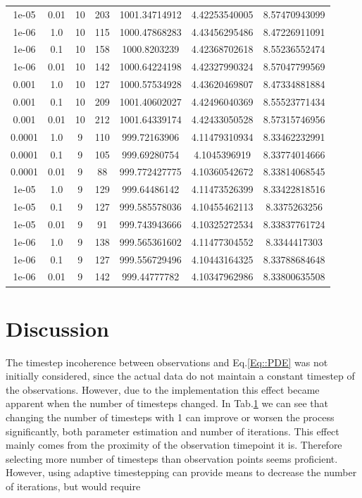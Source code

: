 \documentclass[11pt,a4paper]{article}
\begin{document}
\begin{table}
{\begin{tabular}{*{7}c}
 1e-05 & 0.01 &10 & 203& 1001.34714912 & 4.42253540005 & 8.57470943099 \\ 
 1e-06 & 1.0 &10  & 115& 1000.47868283 & 4.43456295486 & 8.47226911091 \\ 
 1e-06 & 0.1 &10  & 158& 1000.8203239 & 4.42368702618 & 8.55236552474 \\ 
 1e-06 & 0.01 &10 & 142& 1000.64224198 & 4.42327990324 & 8.57047799569 \\ 
 0.001 & 1.0 &10  & 127& 1000.57534928 & 4.43620469807 & 8.47334881884 \\ 
 0.001 & 0.1 &10  & 209& 1001.40602027 & 4.42496040369 & 8.55523771434 \\ 
 0.001 & 0.01 &10 & 212& 1001.64339174 & 4.42433050528 & 8.57315746956 \\ 
 0.0001 & 1.0 &9  & 110& 999.72163906 & 4.11479310934 & 8.33462232991 \\ 
 0.0001 & 0.1 &9  & 105& 999.69280754 & 4.1045396919 & 8.33774014666 \\ 
 0.0001 & 0.01 &9 &  88& 999.772427775 & 4.10360542672 & 8.33814068545 \\ 
 1e-05 & 1.0 &9   & 129& 999.64486142 & 4.11473526399 & 8.33422818516 \\ 
 1e-05 & 0.1 &9   & 127& 999.585578036 & 4.10455462113 & 8.3375263256 \\ 
 1e-05 & 0.01 &9  &  91& 999.743943666 & 4.10325272534 & 8.33837761724 \\ 
 1e-06 & 1.0 &9   & 138& 999.565361602 & 4.11477304552 & 8.3344417303 \\ 
 1e-06 & 0.1 &9   & 127& 999.556729496 & 4.10443164325 & 8.33788684648 \\ 
 1e-06 & 0.01 &9  & 142& 999.44777782 & 4.10347962986 & 8.33800635508 \\ 
\end{tabular}}
\label{Tab::Incoherence}
\end{table} 
\section{Discussion}

The timestep incoherence between observations and Eq.\ref{Eq::PDE} was not initially considered, since the actual data do not maintain a constant timestep of the observations. However, due to the implementation this effect became apparent when the number of timesteps changed. In Tab.\ref{Tab::Incoherence} we can see that changing the number of timesteps with 1 can improve or worsen the process significantly, both parameter estimation and number of iterations. This effect mainly comes from the proximity of the observation timepoint it is.  Therefore selecting more number of timesteps than observation points seems proficient. However, using adaptive timestepping can provide means to decrease the number of iterations, but would require 
\end{document}
